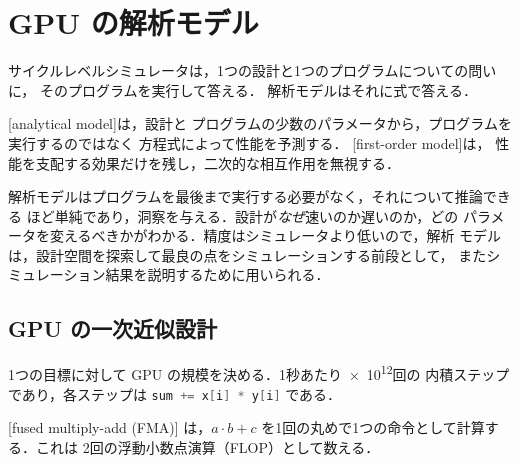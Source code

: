 \documentclass[../main.tex]{subfiles}
\begin{document}
\section{GPU の解析モデル}
\label{sec:l08-analytical}

サイクルレベルシミュレータは，1つの設計と1つのプログラムについての問いに，
そのプログラムを実行して答える．
解析モデルはそれに式で答える．

\begin{definition}[解析モデル]
  \label{def:l08-analytical-model}
  [analytical model]は，設計と
  プログラムの少数のパラメータから，プログラムを実行するのではなく
  方程式によって性能を予測する．
  [first-order model]は，
  性能を支配する効果だけを残し，二次的な相互作用を無視する．
\end{definition}

解析モデルはプログラムを最後まで実行する必要がなく，それについて推論できる
ほど単純であり，洞察を与える．設計が\emph{なぜ}速いのか遅いのか，どの
パラメータを変えるべきかがわかる．精度はシミュレータより低いので，解析
モデルは，設計空間を探索して最良の点をシミュレーションする前段として，
またシミュレーション結果を説明するために用いられる．

\subsection{GPU の一次近似設計}

1つの目標に対して GPU の規模を決める．1秒あたり\num{e12}回の
内積ステップであり，各ステップは
\lstinline[language=C++]!sum += x[i] * y[i]! である．

\begin{definition}[融合積和演算]
  \label{def:l08-fma}
  [fused multiply-add (FMA)]
  は，$a \cdot b + c$ を1回の丸めで1つの命令として計算する．これは
  2回の浮動小数点演算（FLOP）として数える．
\end{definition}
\end{document}
